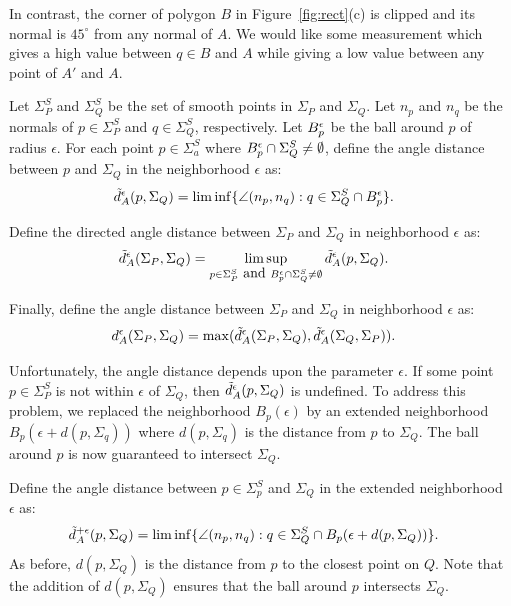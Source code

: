 In contrast, the corner of polygon $B$ in Figure~\ref{fig:rect}(c)
is clipped and its normal is $45^\circ$ from any normal of $A$.
We would like some measurement which gives a high value 
between $q \in B$ and $A$ while giving a low value between
any point of $A'$ and $A$.

Let $\Sigma^S_P$ and $\Sigma^S_Q$ be the set of smooth points
in $\Sigma_P$ and $\Sigma_Q$.
Let $n_p$ and $n_q$ be the normals of $p \in \Sigma^S_P$
and $q \in \Sigma^S_Q$, respectively.
Let $B^{\epsilon}_{p}$ be the ball around $p$ of radius $\epsilon$.
For each point $p \in \Sigma^S_a$ 
where $B^{\epsilon}_{p} \cap \Sigma^S_Q \neq \emptyset$,
define the angle distance between $p$ and $\Sigma_Q$
in the neighborhood $\epsilon$ as:
\begin{align*}
\tilde{d}_A^\epsilon(p,\Sigma_Q) & = \liminf\{ \angle(n_p, n_q) : 
q \in \Sigma^S_Q \cap B^{\epsilon}_{p} \}.
\end{align*}

Define the directed angle distance between $\Sigma_P$ and $\Sigma_Q$
in neighborhood $\epsilon$ as:
\begin{align*}
\tilde{d}_A^\epsilon(\Sigma_P,\Sigma_Q) & = 
  \limsup_{p \in \Sigma^S_P \mbox{ and } 
  B^{\epsilon}_{p} \cap \Sigma^S_Q \neq \emptyset} 
         \tilde{d}_A^\epsilon(p,\Sigma_Q).
\end{align*}

Finally, define the angle distance between $\Sigma_P$ and $\Sigma_Q$
in neighborhood $\epsilon$ as:
\begin{align*}
d_A^\epsilon(\Sigma_P,\Sigma_Q) & = 
\max(\tilde{d}_A^\epsilon(\Sigma_P,\Sigma_Q), \tilde{d}_A^\epsilon(\Sigma_Q,\Sigma_P)).
\end{align*}

Unfortunately, the angle distance depends upon the parameter $\epsilon$.
If some point $p \in \Sigma^S_P$ is not within $\epsilon$ of $\Sigma_Q$,
then $\tilde{d}_A^\epsilon(p,\Sigma_Q)$ is undefined.
To address this problem, we replaced the neighborhood $B_p(\epsilon)$
by an extended neighborhood $B_p(\epsilon+d(p,\Sigma_q))$
where $d(p,\Sigma_q)$ is the distance from $p$ to $\Sigma_Q$.
The ball around $p$ is now guaranteed to intersect $\Sigma_Q$.

Define the angle distance 
between $p \in \Sigma^S_p$ and $\Sigma_Q$ in the extended
neighborhood $\epsilon$ as:
\begin{align*}
\tilde{d}_A^{+\epsilon}(p,\Sigma_Q) & = 
  \liminf\{ \angle(n_p, n_q) : 
     q \in \Sigma^S_Q \cap B_p(\epsilon+d(p,\Sigma_Q)) \}.
\end{align*}
As before, $d(p,\Sigma_Q)$ is the distance from $p$ to the closest point on $Q$.
Note that the addition of $d(p,\Sigma_Q)$ ensures that the ball
around $p$ intersects $\Sigma_Q$.

